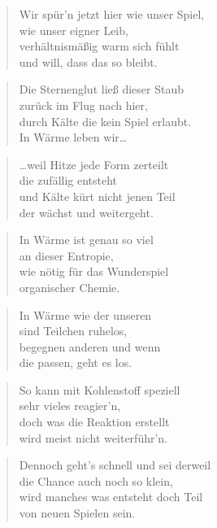 \documentclass[10pt,a4paper]{article}
\begin{document}
\begin{paracol}{2}
\begin{verse}
Wir spür’n jetzt hier wie unser Spiel, \\
wie unser eigner Leib, \\
verhältnismäßig warm sich fühlt \\
und will, dass das so bleibt. \\
\end{verse}

\begin{verse}
Die Sternenglut ließ dieser Staub \\
zurück im Flug nach hier, \\
durch Kälte die kein Spiel erlaubt. \\
In Wärme leben wir… \\
\end{verse}

\begin{verse}
…weil Hitze jede Form zerteilt \\
die zufällig entsteht \\
und Kälte kürt nicht jenen Teil \\
der wächst und weitergeht. \\
\end{verse}

\begin{verse}
In Wärme ist genau so viel \\
an dieser Entropie, \\
wie nötig für das Wunderspiel \\
organischer Chemie. \\
\end{verse}

\begin{verse}
In Wärme wie der unseren \\
sind Teilchen ruhelos, \\
begegnen anderen und wenn \\
die passen, geht es los. \\
\end{verse}

\begin{verse}
So kann mit Kohlenstoff speziell \\
sehr vieles reagier’n, \\
doch was die Reaktion erstellt \\
wird meist nicht weiterführ’n. \\
\end{verse}

\begin{verse}
Dennoch geht’s schnell und sei derweil \\
die Chance auch noch so klein, \\
wird manches was entsteht doch Teil \\
von neuen Spielen sein. \\
\end{verse}


\end{paracol}
\end{document}
